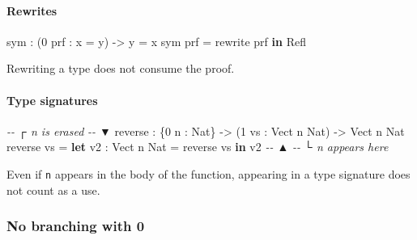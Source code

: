 \documentclass[
]{article}
\newenvironment{Shaded}{}{}
\newcommand{\CommentTok}[1]{\textcolor[rgb]{0.38,0.63,0.69}{\textit{#1}}}
\newcommand{\DataTypeTok}[1]{\textcolor[rgb]{0.56,0.13,0.00}{#1}}
\newcommand{\DecValTok}[1]{\textcolor[rgb]{0.25,0.63,0.44}{#1}}
\newcommand{\FunctionTok}[1]{\textcolor[rgb]{0.02,0.16,0.49}{#1}}
\newcommand{\KeywordTok}[1]{\textcolor[rgb]{0.00,0.44,0.13}{\textbf{#1}}}
\newcommand{\NormalTok}[1]{#1}
\newcommand{\OperatorTok}[1]{\textcolor[rgb]{0.40,0.40,0.40}{#1}}
\newcommand{\OtherTok}[1]{\textcolor[rgb]{0.00,0.44,0.13}{#1}}
\begin{document}
\hypertarget{rewrites}{%
\paragraph{Rewrites}\label{rewrites}}

\begin{Shaded}
\begin{Highlighting}[]
\NormalTok{sym }\OperatorTok{:}\NormalTok{ (}\DecValTok{0}\NormalTok{ prf }\OperatorTok{:}\NormalTok{ x }\OtherTok{=}\NormalTok{ y) }\OtherTok{{-}\textgreater{}}\NormalTok{ y }\OtherTok{=}\NormalTok{ x}
\NormalTok{sym prf }\OtherTok{=}\NormalTok{ rewrite prf }\KeywordTok{in} \DataTypeTok{Refl}
\end{Highlighting}
\end{Shaded}

Rewriting a type does not consume the proof.

\hypertarget{type-signatures}{%
\paragraph{Type signatures}\label{type-signatures}}

\begin{Shaded}
\begin{Highlighting}[]
\CommentTok{{-}{-}          ┌ \textasciigrave{}n\textasciigrave{} is erased}
\CommentTok{{-}{-}          ▼}
\NormalTok{reverse\textquotesingle{} }\OperatorTok{:}\NormalTok{ \{}\DecValTok{0}\NormalTok{ n }\OperatorTok{:} \DataTypeTok{Nat}\NormalTok{\} }\OtherTok{{-}\textgreater{}}\NormalTok{ (}\DecValTok{1}\NormalTok{ vs }\OperatorTok{:} \DataTypeTok{Vect}\NormalTok{ n }\DataTypeTok{Nat}\NormalTok{) }\OtherTok{{-}\textgreater{}} \DataTypeTok{Vect}\NormalTok{ n }\DataTypeTok{Nat}
\NormalTok{reverse\textquotesingle{} vs }\OtherTok{=} \KeywordTok{let}\NormalTok{ v2 }\OperatorTok{:} \DataTypeTok{Vect}\NormalTok{ n }\DataTypeTok{Nat} \OtherTok{=} \FunctionTok{reverse}\NormalTok{ vs }\KeywordTok{in}\NormalTok{ v2}
\CommentTok{{-}{-}                          ▲}
\CommentTok{{-}{-}                          └ \textasciigrave{}n\textasciigrave{} appears here}
\end{Highlighting}
\end{Shaded}

Even if \texttt{n} appears in the body of the function, appearing in a
type signature does not count as a use.

\hypertarget{no-branching-with-0}{%
\subsubsection{No branching with 0}\label{no-branching-with-0}}
\end{document}

